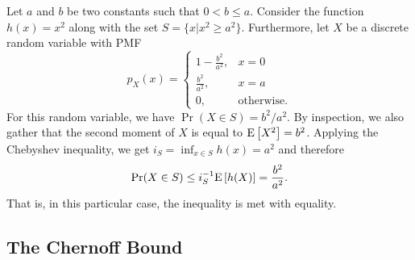 \begin{example}
Let $a$ and $b$ be two constants such that $0 < b \leq a$.
Consider the function $h(x) = x^2$ along with the set $S = \{ x | x^2 \geq a^2 \}$.
Furthermore, let $X$ be a discrete random variable with PMF
\begin{equation*}
p_X (x) = \left\{ \begin{array}{ll} 1 - \frac{b^2}{a^2}, & x = 0 \\
\frac{b^2}{a^2}, & x = a \\
0, & \text{otherwise.} \end{array} \right.
\end{equation*}
For this random variable, we have $\Pr (X \in S) = b^2/a^2$.
By inspection, we also gather that the second moment of $X$ is equal to $\mathrm{E} \left[ X^2 \right] = b^2$.
Applying the Chebyshev inequality, we get $i_S = \inf_{x \in S} h(x) = a^2$ and therefore
\begin{equation*}
\Pr (X \in S) \leq i_S^{-1} \mathrm{E} \left[ h(X) \right]
= \frac{b^2}{a^2} .
\end{equation*}
That is, in this particular case, the inequality is met with equality.
\end{example}


\subsection{The Chernoff Bound}

